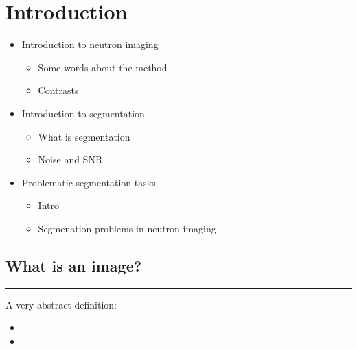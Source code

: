 \documentclass[letterpaper,10pt,english]{sphinxmanual}
\begin{document}
\chapter{Introduction}
\label{\detokenize{ML4NeutronImageSegmentation:introduction}}\begin{itemize}
\item {} 
Introduction to neutron imaging
\begin{itemize}
\item {} 
Some words about the method

\item {} 
Contrasts

\end{itemize}

\item {} 
Introduction to segmentation
\begin{itemize}
\item {} 
What is segmentation

\item {} 
Noise and SNR

\end{itemize}

\item {} 
Problematic segmentation tasks
\begin{itemize}
\item {} 
Intro

\item {} 
Segmenation problems in neutron imaging

\end{itemize}

\end{itemize}


\section{What is an image?}
\label{\detokenize{ML4NeutronImageSegmentation:what-is-an-image}}

\bigskip\hrule\bigskip


A very abstract definition:
\begin{itemize}
\item {} 

\item {} 

\end{itemize}
\end{document}
